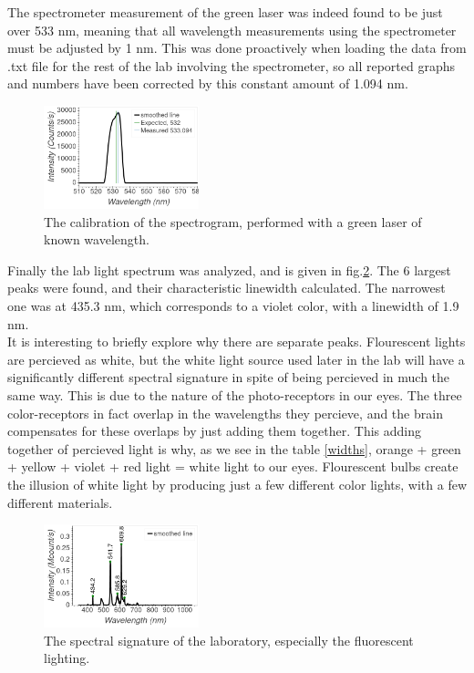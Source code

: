 \documentclass[aps,prl,reprint]{revtex4-2}
\begin{document}
The spectrometer measurement of the green laser was indeed found to be just over 533 nm,
meaning that all wavelength measurements using the spectrometer must be adjusted by 
1 nm. This was done proactively when loading the data from .txt file for the rest of the
lab involving the spectrometer, so all reported graphs and numbers have been corrected 
by this constant amount of 1.094 nm.

\begin{figure}[h]
	\includegraphics[width=0.4\textwidth]{../Images/l3_A_green.png}
	\caption{\label{green} The calibration of the spectrogram, performed with
	a green laser of known wavelength.}
\end{figure}

Finally the lab light spectrum was analyzed, and is given in fig.\ref{lablight}.
The 6 largest peaks were found, and their
characteristic linewidth calculated. The narrowest one was at 435.3 nm, which 
corresponds to a violet color, with a linewidth of 1.9 nm. \\

It is interesting to briefly explore why there are separate peaks. Flourescent lights
are percieved as white, but the white light source used later in the lab will have
a significantly different spectral signature in spite of being percieved in much
the same way. This is due to the nature of the photo-receptors in our eyes. The three
color-receptors in fact overlap in the wavelengths they percieve, and the brain 
compensates for these overlaps by just adding them together. This adding together of
percieved light is why, as we see in the table \ref{widths}, orange + green + yellow + 
violet + red light = white light to our eyes. Flourescent bulbs create the illusion
of white light by producing just a few different color lights, with a few different
materials. \\

\begin{figure}[h]
	\includegraphics[width=0.4\textwidth]{../Images/l3_A_lablight.png}
	\caption{\label{lablight} The spectral signature of the laboratory, especially
	the fluorescent lighting.}
\end{figure}
\end{document}
